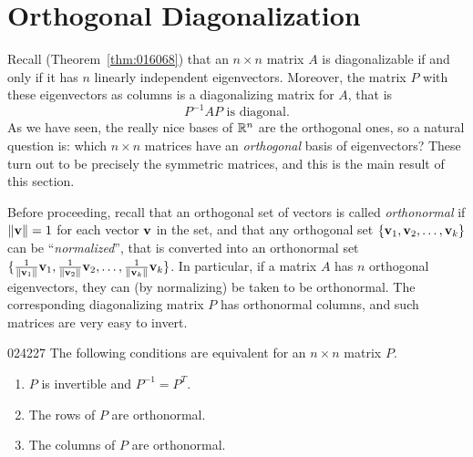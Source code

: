 \section{Orthogonal Diagonalization}
\label{sec:8_2}

Recall (Theorem~\ref{thm:016068}) that an $n \times n$ matrix $A$ is diagonalizable if and only if it has $n$ linearly independent eigenvectors. Moreover, the matrix $P$ with these eigenvectors as columns is a diagonalizing matrix for $A$, that is
\begin{equation*}
P^{-1}AP \mbox{ is diagonal.}
\end{equation*}
As we have seen, the really nice bases of $\mathbb{R}^n$ are the orthogonal ones, so a natural question is: which $n \times n$ matrices have an \textit{orthogonal} basis of eigenvectors? These turn out to be precisely the symmetric matrices, and this is the main result of this section.


Before proceeding, recall that an orthogonal set of vectors is called \textit{orthonormal} if $\|\textbf{v}\| = 1$ for each vector $\textbf{v}$ in the set, and that any orthogonal set $\{\textbf{v}_{1}, \textbf{v}_{2}, \dots, \textbf{v}_{k}\}$ can be ``\textit{normalized}'', that is converted into an orthonormal set $\lbrace \tfrac{1}{\| \textbf{v}_{1} \|}\textbf{v}_{1}, \tfrac{1}{\| \textbf{v}_{2} \|}\textbf{v}_{2}, \dots, \tfrac{1}{\| \textbf{v}_{k} \|}\textbf{v}_{k} \rbrace$. In particular, if a matrix $A$ has $n$ orthogonal eigenvectors, they can (by normalizing) be taken to be orthonormal. The corresponding diagonalizing matrix $P$ has orthonormal columns, and such matrices are very easy to invert.


\begin{theorem}{}{024227}
The following conditions are equivalent for an $n \times n$ matrix $P$.


\begin{enumerate}
\item $P$ is invertible and $P^{-1} = P^{T}$.

\item The rows of $P$ are orthonormal.

\item The columns of $P$ are orthonormal.

\end{enumerate}
\end{theorem}

